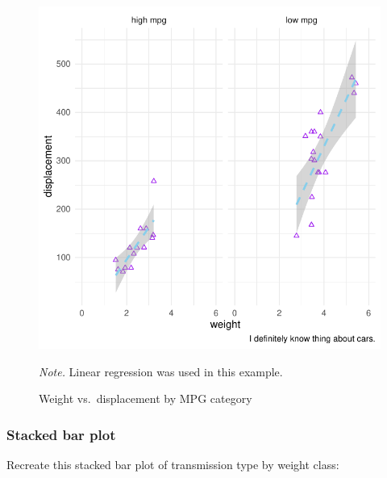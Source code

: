 \documentclass[
  man,
  floatsintext,
  longtable,
  nolmodern,
  notxfonts,
  notimes,
  colorlinks=true,linkcolor=blue,citecolor=blue,urlcolor=blue]{apa7}
\begin{document}
\begin{figure}[H]

{\caption{{Weight vs.~displacement by MPG
category}{\label{fig-plot5-faceted-scatterplot}}}}

\includegraphics{data-visualization_files/figure-pdf/fig-plot5-faceted-scatterplot-1.pdf}

{\noindent \emph{Note.} Linear regression was used in this example.}

\end{figure}

\subsubsection{Stacked bar plot}\label{stacked-bar-plot}

Recreate this stacked bar plot of transmission type by weight class:
\end{document}
